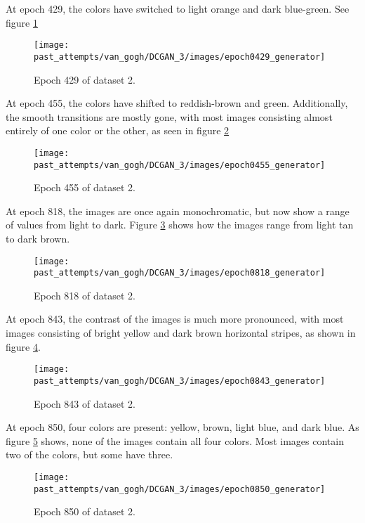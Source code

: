 \documentclass[11pt,letterpaper]{article}
\begin{document}
				At epoch 429, the colors have switched to light orange and dark blue-green.
				See figure \ref{fig:cgvg:epoch0429generator}
				\begin{figure}
					\centering
					\texttt{[image: past\_attempts/van\_gogh/DCGAN\_3/images/epoch0429\_generator]}
					\caption{Epoch 429 of dataset 2.}
					\label{fig:cgvg:epoch0429generator}
				\end{figure}

				At epoch 455, the colors have shifted to reddish-brown and green.
				Additionally, the smooth transitions are mostly gone, with most images consisting almost entirely of one color or the other, as seen in figure \ref{fig:cgvg:epoch0455generator}
				\begin{figure}
					\centering
					\texttt{[image: past\_attempts/van\_gogh/DCGAN\_3/images/epoch0455\_generator]}
					\caption{Epoch 455 of dataset 2.}
					\label{fig:cgvg:epoch0455generator}
				\end{figure}

				At epoch 818, the images are once again monochromatic, but now show a range of values from light to dark.
				Figure \ref{fig:cgvg:epoch0818generator} shows how the images range from light tan to dark brown.
				\begin{figure}
					\centering
					\texttt{[image: past\_attempts/van\_gogh/DCGAN\_3/images/epoch0818\_generator]}
					\caption{Epoch 818 of dataset 2.}
					\label{fig:cgvg:epoch0818generator}
				\end{figure}

				At epoch 843, the contrast of the images is much more pronounced, with most images consisting of bright yellow and dark brown horizontal stripes, as shown in figure \ref{fig:cgvg:epoch0843generator}.
				\begin{figure}
					\centering
					\texttt{[image: past\_attempts/van\_gogh/DCGAN\_3/images/epoch0843\_generator]}
					\caption{Epoch 843 of dataset 2.}
					\label{fig:cgvg:epoch0843generator}
				\end{figure}

				At epoch 850, four colors are present: yellow, brown, light blue, and dark blue.
				As figure \ref{fig:cgvg:epoch0850generator} shows, none of the images contain all four colors.
				Most images contain two of the colors, but some have three.
				\begin{figure}
					\centering
					\texttt{[image: past\_attempts/van\_gogh/DCGAN\_3/images/epoch0850\_generator]}
					\caption{Epoch 850 of dataset 2.}
					\label{fig:cgvg:epoch0850generator}
				\end{figure}
\end{document}
